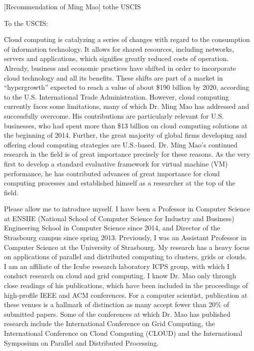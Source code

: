 \documentclass[a4paper,10pt]{article}
\begin{document}

\begin{letter}[Recommendation of Ming Mao]%
{to}{the USCIS}
 
To the USCIS:

Cloud computing is catalyzing a series of changes with regard to the consumption
of information technology.  It allows  for shared resources, including networks,
servers   and   applications,  which   signifies   greatly   reduced  costs   of
operation. Already,  business and  economic practices have  shifted in  order to
incorporate cloud  technology and all its  benefits. These shifts are  part of a
market   in    “hypergrowth”   expected    to   reach    a   value    of   about
\$190   billion   by  2020,   according   to   the  U.S.    International   Trade
Administration. However, cloud computing  currently faces some limitations, many
of which Dr. Ming Mao has addressed and successfully overcome. His contributions
are particularly  relevant for  U.S.  businesses,  who had  spent more  than \$13
billion on  cloud computing solutions  at the  beginning of 2014.   Further, the
great  majority  of  global  firms   developing  and  offering  cloud  computing
strategies are U.S.-based. Dr. Ming Mao’s  continued research in the field is of
great importance  precisely for these  reasons. As the  very first to  develop a
standard  evaluative framework  for  virtual machine  (VM)  performance, he  has
contributed  advances of  great  importance for  cloud  computing processes  and
established himself as a researcher at the top of the field.  

Please  allow me  to introduce  myself.   I have  been a  Professor in  Computer
Science  at  ENSIIE  (National  School  of Computer  Science  for  Industry  and
Business) Engineering School in Computer Science since 2014, and Director of the
Strasbourg campus since spring 2013. Previously, I was an Assistant Professor in
Computer Science at the University of  Strasbourg. My research has a heavy focus
on  applications of  parallel and  distributed computing  to clusters,  grids or
clouds. I  am an  affiliate of  the Icube research  laboratory ICPS  group, with
which  I conduct  research on  cloud and  grid computing.  I know  Dr. Mao  only
through close  readings of  his publications,  which have  been included  in the
proceedings of high-profile IEEE and  ACM conferences. For a computer scientist,
publication at  these venues is a  hallmark of distinction as  many accept fewer
than 20\%  of submitted  papers. Some of  the conferences at  which Dr.  Mao has
published research include  the International Conference on  Grid Computing, the
International  Conference  on  Cloud  Computing (CLOUD)  and  the  International
Symposium on Parallel and Distributed Processing.   


\end{letter}
\end{document}
